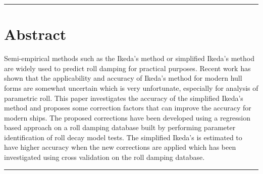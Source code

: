 {\footnotesize
\noindent\rule{\columnwidth}{0.4pt}
\section*{Abstract}\label{se:abstract}

Semi-empirical methods such as the Ikeda’s method or simplified Ikeda’s method are widely used to predict roll damping for practical purposes. Recent work has shown that the applicability and accuracy of Ikeda’s method for modern hull forms are somewhat uncertain which is very unfortunate, especially for analysis of parametric roll. 
This paper investigates the accuracy of the simplified Ikeda's method and proposes some correction factors that can improve the accuracy for modern ships. The proposed corrections have been developed using a regression based approach on a roll damping database built by performing parameter identification of roll decay model tests. The simplified Ikeda's is estimated to have higher accuracy when the new corrections are applied which has been investigated using cross validation on the roll damping database. 


}
\newline
\noindent\rule{\columnwidth}{0.4pt}